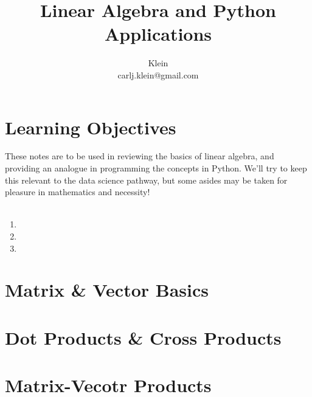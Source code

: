 \documentclass{article}
\begin{document}
	\title{Linear Algebra and Python Applications}
	\author{Klein \\ carlj.klein@gmail.com}
	\date{}
	\maketitle

\section{Learning Objectives}
These notes are to be used in reviewing the basics of linear algebra, and providing an analogue in programming the concepts in Python. We'll try to keep this relevant to the data science pathway, but some asides may be taken for pleasure in mathematics and necessity!
\\\\

\begin{enumerate}
	\item {}
	\item {}
	\item {}
\end{enumerate}

\section{Matrix \& Vector Basics}\label{sec:concept1}


\section{Dot Products \& Cross Products}\label{sec:concept2}

\section{Matrix-Vecotr Products}\label{sec:concept3}
\end{document}
